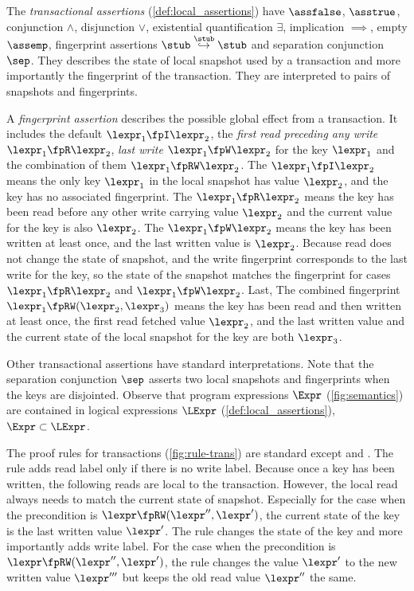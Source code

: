 The \emph{transactional assertions} (\cref{def:local_assertions}) have \( \assfalse \), \(\asstrue \), conjunction \( \land \), disjunction \( \lor \), existential quantification \( \exists \), implication \( \implies  \), empty \( \assemp \), fingerprint assertions \( \stub \stackrel{\stub}{\hookrightarrow} \stub \) and separation conjunction \( \sep \).
They describes the state of local snapshot used by a transaction and more importantly the fingerprint of the transaction.
They are interpreted to pairs of snapshots and fingerprints.

A \emph{fingerprint assertion} describes the possible global effect from a transaction.
It includes the default \(\lexpr_{1} \fpI \lexpr_{2} \), the \emph{first read preceding any write} \( \lexpr_{1} \fpR \lexpr_{2} \), \emph{last write} \( \lexpr_{1} \fpW \lexpr_{2} \) for the key \( \lexpr_{1} \) and the combination of them \( \lexpr_{1} \fpRW \lexpr_{2} \).
The \( \lexpr_{1} \fpI \lexpr_{2} \) means the only key \( \lexpr_{1} \) in the local snapshot has value \( \lexpr_{2} \),
and the key has no associated fingerprint.
The \( \lexpr_{1} \fpR \lexpr_{2} \) means the key has been read before any other write carrying value \( \lexpr_{2} \) and the current value for the key is also \( \lexpr_{2} \).
The \( \lexpr_{1} \fpW \lexpr_{2} \) means the key has been written at least once, and the last written value is \( \lexpr_{2} \).
Because read does not change the state of snapshot, and the write fingerprint corresponds to the last write for the key,
so the state of the snapshot matches the fingerprint for cases \( \lexpr_{1} \fpR \lexpr_{2} \) and  \( \lexpr_{1} \fpW \lexpr_{2} \).
Last, The combined fingerprint \( \lexpr_{1} \fpRW (\lexpr_{2}, \lexpr_{3}) \) means the key has been read and then written at least once, the first read fetched value \( \lexpr_{2} \), and the last written value and the current state of the local snapshot for the key are both \( \lexpr_{3} \).

Other transactional assertions have standard interpretations.
Note that the separation conjunction \( \sep \) asserts two local snapshots and fingerprints when the keys are disjointed.
Observe that program expressions $\Expr$ (\cref{fig:semantics}) are contained in logical expressions $\LExpr$ (\cref{def:local_assertions}), \ie $\Expr \subset \LExpr$. 

The proof rules for transactions (\cref{fig:rule-trans}) are standard except  and .
The  rule adds read label only if there is no write label.
Because once a key has been written, the following reads are local to the transaction.
However, the local read always needs to match the current state of snapshot.
Especially for the case when the precondition is \( \lexpr \fpRW (\lexpr'', \lexpr') \),
the current state of the key is the last written value \( \lexpr' \).
The rule changes the state of the key and more importantly adds write label.
For the case when the precondition is \( \lexpr \fpRW (\lexpr'', \lexpr') \), 
the rule changes the value \( \lexpr' \) to the new written value \( \lexpr''' \)
but keeps the old read value \( \lexpr'' \) the same.

